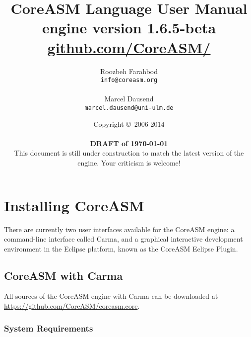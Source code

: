 \documentclass{article}
\newcommand{\version}{1.6.5-beta}
\newcommand{\CoreASM}{{\sffamily CoreASM}\xspace}
\newcommand{\Carma}{{\sffamily Carma}\xspace}
\newcommand{\copyrightNotice}[1]{{Copyright \copyright\ #1}}
\begin{document}

\title{\huge \CoreASM Language User Manual \\ {\Large engine version \version} \\ {\large \url{github.com/CoreASM/}}}

\author{Roozbeh Farahbod \\ \texttt{info@coreasm.org}\\\\Marcel Dausend \\ \texttt{marcel.dausend@uni-ulm.de}}  

\date{\copyrightNotice{2006-2014} \\~\\ {\bf DRAFT of \today} \\ {This document is still under construction to match the latest version of the engine. Your criticism is welcome!}}

 \maketitle

\newpage
\tableofcontents
\newpage


\section{Installing \CoreASM}

There are currently two user interfaces available for the \CoreASM engine: a
command-line interface called \Carma, and a graphical interactive
development environment in the Eclipse platform, known as the \CoreASM Eclipse
Plugin.


\subsection{\CoreASM with \Carma}

All sources of the \CoreASM engine with \Carma can be downloaded at \url{https://github.com/CoreASM/coreasm.core}.


\subsubsection{System Requirements}
\end{document}
